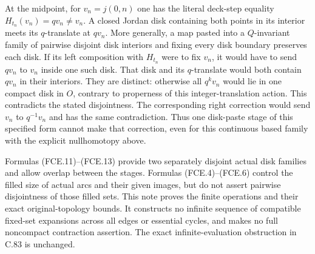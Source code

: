 At the midpoint, for $v_n=j(0,n)$ one has the literal
deck-step equality $H_{t_n}(v_n)=qv_n\ne v_n$.
A closed Jordan disk containing both points in its
interior meets its $q$-translate at $qv_n$.
More generally, a map pasted into a $Q$-invariant family
of pairwise disjoint disk interiors and fixing every
disk boundary preserves each disk. If its left
composition with $H_{t_n}$ were to fix $v_n$, it would
have to send $qv_n$ to $v_n$ inside one such disk.
That disk and its $q$-translate would both contain
$qv_n$ in their interiors. They are distinct: otherwise
all $q^kv_n$ would lie in one compact disk in $O$,
contrary to properness of this integer-translation action.
This contradicts the stated disjointness. The corresponding right correction would
send $v_n$ to $q^{-1}v_n$ and has the same contradiction.
Thus one disk-paste stage of this specified form cannot
make that correction, even for this continuous based
family with the explicit nullhomotopy above.

Formulas (FCE.11)--(FCE.13) provide two separately
disjoint actual disk families and allow overlap between
the stages. Formulas (FCE.4)--(FCE.6) control the filled
size of actual arcs and their given images, but do not
assert pairwise disjointness of those filled sets.
This note proves the finite operations and their exact
original-topology bounds. It constructs no infinite
sequence of compatible fixed-set expansions across all
edges or essential cycles, and makes no full noncompact
contraction assertion. The exact infinite-evaluation
obstruction in C.83 is unchanged.
